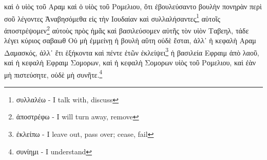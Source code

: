 
καὶ
ὁ
υἱὸς
τοῦ
Αραμ
καὶ
ὁ
υἱὸς
τοῦ
Ρομελιου,
ὅτι
ἐβουλεύσαντο
βουλὴν
πονηρὰν
περὶ
σοῦ 
λέγοντες
Ἀναβησόμεθα
εἰς
τὴν
Ιουδαίαν
καὶ
συλλαλήσαντες\footnote{συλλαλέω - I talk with, discuss}
αὐτοῖς
ἀποστρέψομεν\footnote{ἀποστρέφω - I will turn away, remove}
αὐτοὺς
πρὸς
ἡμᾶς
καὶ
βασιλεύσομεν
αὐτῆς
τὸν
υἱὸν
Ταβεηλ,
τάδε
λέγει
κύριος
σαβαωθ
Οὐ
μὴ
ἐμμείνῃ
ἡ
βουλὴ
αὕτη
οὐδὲ
ἔσται,
ἀλλ᾽
ἡ
κεφαλὴ
Αραμ
Δαμασκός,
ἀλλ᾽
ἔτι
ἑξήκοντα
καὶ
πέντε
ἐτῶν
ἐκλείψει\footnote{ἐκλείπω - I leave out, pass over; cease, fail}
ἡ
βασιλεία
Εφραιμ
ἀπὸ
λαοῦ,
καὶ
ἡ
κεφαλὴ
Εφραιμ
Σομορων,
καὶ
ἡ
κεφαλὴ
Σομορων
υἱὸς
τοῦ
Ρομελιου,
καὶ
ἐὰν
μὴ
πιστεύσητε,
οὐδὲ
μὴ
συνῆτε.\footnote{συνίημι - I understand}





